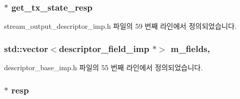 \subsubsection[{\texorpdfstring{get\+\_\+tx\+\_\+state\+\_\+resp}{get_tx_state_resp}}]{$\ast$ get\+\_\+tx\+\_\+state\+\_\+resp}\hypertarget{classavdecc__lib_1_1stream__output__descriptor__imp_a7ed2c3b980a4d1c9981cb46190e8db9e}{}\label{classavdecc__lib_1_1stream__output__descriptor__imp_a7ed2c3b980a4d1c9981cb46190e8db9e}


stream\+\_\+output\+\_\+descriptor\+\_\+imp.\+h 파일의 59 번째 라인에서 정의되었습니다.

\subsubsection[{\texorpdfstring{m\+\_\+fields}{m_fields}}]{\setlength{\rightskip}{0pt plus 5cm}std\+::vector$<${\bf descriptor\+\_\+field\+\_\+imp} $\ast$$>$ m\+\_\+fields\hspace{0.3cm}{\ttfamily [protected]}, {\ttfamily [inherited]}}\hypertarget{classavdecc__lib_1_1descriptor__base__imp_adce67136eb9c66da9c189b730077b9cd}{}\label{classavdecc__lib_1_1descriptor__base__imp_adce67136eb9c66da9c189b730077b9cd}


descriptor\+\_\+base\+\_\+imp.\+h 파일의 55 번째 라인에서 정의되었습니다.

\subsubsection[{\texorpdfstring{resp}{resp}}]{$\ast$ resp}\hypertarget{classavdecc__lib_1_1stream__output__descriptor__imp_a48592b631f05337146bcc262acfa95c9}{}\label{classavdecc__lib_1_1stream__output__descriptor__imp_a48592b631f05337146bcc262acfa95c9}


